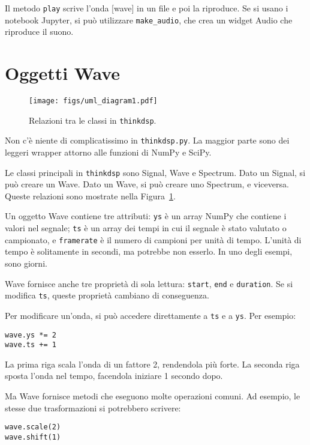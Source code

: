 \documentclass[12pt,a4paper]{book}
\begin{document}
Il metodo {\tt play} scrive l'onda [wave] in un file e poi la riproduce. Se si usano i notebook Jupyter, si può utilizzare \verb"make_audio", che crea un widget Audio che riproduce il suono.

\section{Oggetti Wave} 

\begin{figure} 

\centerline{\texttt{[image: figs/uml\_diagram1.pdf]}} \caption{Relazioni tra le classi in {\tt thinkdsp}.} \label{fig.diagram1} \end{figure} 

Non c'è niente di complicatissimo in {\tt thinkdsp.py}. La maggior parte sono dei leggeri wrapper attorno alle funzioni di NumPy e SciPy.

Le classi principali in {\tt thinkdsp} sono Signal, Wave e Spectrum. Dato un Signal, si può creare un Wave. Dato un Wave, si può creare uno Spectrum, e viceversa. Queste relazioni sono mostrate nella Figura~\ref{fig.diagram1}.

Un oggetto Wave contiene tre attributi: {\tt ys} è un array NumPy che contiene i valori nel segnale; {\tt ts} è un array dei tempi in cui il segnale è stato valutato o campionato, e {\tt framerate} è il numero di campioni per unità di tempo. L'unità di tempo è solitamente in secondi, ma potrebbe non esserlo. In uno degli esempi, sono giorni.

Wave fornisce anche tre proprietà di sola lettura: {\tt start}, {\tt end} e {\tt duration}. Se si modifica {\tt ts}, queste proprietà cambiano di conseguenza.

Per modificare un'onda, si può accedere direttamente a {\tt ts} e a {\tt ys}. Per esempio:

\begin{verbatim} 
wave.ys *= 2
wave.ts += 1
 \end{verbatim} 

La prima riga scala l'onda di un fattore 2, rendendola più forte. La seconda riga sposta l'onda nel tempo, facendola iniziare 1 secondo dopo.

Ma Wave fornisce metodi che eseguono molte operazioni comuni. Ad esempio, le stesse due trasformazioni si potrebbero scrivere:

\begin{verbatim} 
wave.scale(2)
wave.shift(1)
 \end{verbatim} 
\end{document}
